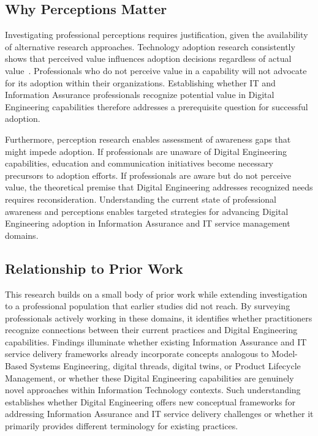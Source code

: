 \subsection{Why Perceptions Matter}

Investigating professional perceptions requires justification, given the availability of alternative research approaches. Technology adoption research consistently shows that perceived value influences adoption decisions regardless of actual value~\parencite{Davis_1989}. Professionals who do not perceive value in a capability will not advocate for its adoption within their organizations. Establishing whether IT and Information Assurance professionals recognize potential value in Digital Engineering capabilities therefore addresses a prerequisite question for successful adoption.

Furthermore, perception research enables assessment of awareness gaps that might impede adoption. If professionals are unaware of Digital Engineering capabilities, education and communication initiatives become necessary precursors to adoption efforts. If professionals are aware but do not perceive value, the theoretical premise that Digital Engineering addresses recognized needs requires reconsideration. Understanding the current state of professional awareness and perceptions enables targeted strategies for advancing Digital Engineering adoption in Information Assurance and IT service management domains.

\subsection{Relationship to Prior Work}

This research builds on a small body of prior work while extending investigation to a professional population that earlier studies did not reach. By surveying professionals actively working in these domains, it identifies whether practitioners recognize connections between their current practices and Digital Engineering capabilities. Findings illuminate whether existing Information Assurance and IT service delivery frameworks already incorporate concepts analogous to Model-Based Systems Engineering, digital threads, digital twins, or Product Lifecycle Management, or whether these Digital Engineering capabilities are genuinely novel approaches within Information Technology contexts. Such understanding establishes whether Digital Engineering offers new conceptual frameworks for addressing Information Assurance and IT service delivery challenges or whether it primarily provides different terminology for existing practices.

